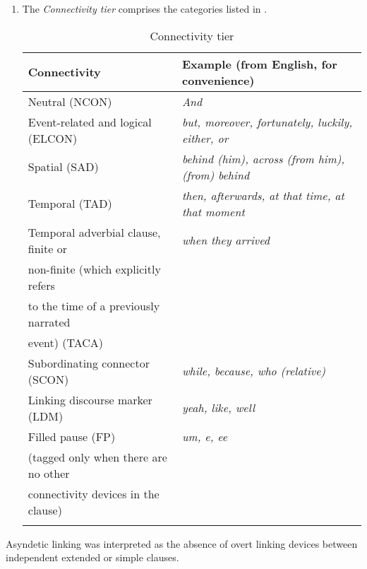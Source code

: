 \documentclass[output=paper,colorlinks,citecolor=brown]{langscibook}
\begin{document}
\begin{enumerate}[label=\Roman*.]
\item
The \textit{Connectivity tier} comprises the categories listed in .

\begin{table}
\caption{Connectivity tier}
\label{table:schroederetal:3}
\begin{tabularx}{\textwidth}{lQ}
 \lsptoprule
Connectivity & Example (from English, for convenience) \\\midrule
 Neutral (NCON)  & \textit{And}   \\
 Event-related and logical (ELCON) & \textit{but, moreover, fortunately, luckily, either, or} \\
 Spatial (SAD) & \textit{behind (him), across (from him), (from) behind}\\
 Temporal (TAD) & \textit{then, afterwards, at that time, at that moment}\\
 Temporal adverbial clause, finite or & \textit{when they arrived}\\
 non-finite (which explicitly refers & ~ \\
 to the time of a previously narrated & ~ \\
 event) (TACA) & ~ \\
 Subordinating connector (SCON) & \textit{while, because, who (relative)}\\
 Linking discourse marker (LDM) & \textit{yeah, like, well}\\
 Filled pause (FP) & \textit{um, e, ee } \\
 (tagged only when there are no other & ~ \\
 connectivity devices in the clause) \\
\lspbottomrule
\end{tabularx}
\end{table}

\end{enumerate}

Asyndetic linking was interpreted as the absence of overt linking devices between independent extended or simple clauses.
\end{document}
